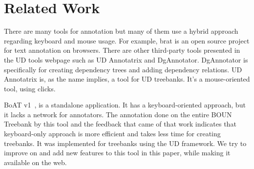 \section{Related Work}
\label{sec:related}

There are many tools for annotation but many of them use a hybrid approach regarding keyboard and mouse usage.
For example, brat is an open source project for text annotation on browsers.\cite{brat}\cite{UD}
There are other third-party tools presented in the UD tools webpage such as UD Annotatrix\cite{tyers-etal:2018} and DgAnnotator\cite{dgannotator}.
DgAnnotator is specifically for creating dependency trees and adding dependency relations.
UD Annotatrix is, as the name implies, a tool for UD treebanks.
It's a mouse-oriented tool, using clicks.

BoAT v1~\cite{turk-etal-2019-turkish}, is a standalone application.
It has a keyboard-oriented approach, but it lacks a network for annotators.
The annotation done on the entire BOUN Treebank by this tool and the feedback that came of that work indicates that keyboard-only approach is more efficient and takes less time for creating treebanks.
It was implemented for treebanks using the UD framework.
We try to improve on and add new features to this tool in this paper, while making it available on the web.
